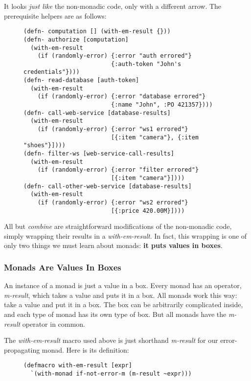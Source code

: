 \documentclass[11pt]{article}
\begin{document}
It looks \emph{just like} the non-monadic code, only with a different
arrow. The prerequisite helpers are as follows:

\begin{figure}[H]
\label{monadic-helpers-1}
\begin{verbatim}
(defn- computation [] (with-em-result {}))
(defn- authorize [computation]
  (with-em-result
    (if (randomly-error) {:error "auth errored"}
                         {:auth-token "John's credentials"})))
(defn- read-database [auth-token]
  (with-em-result
    (if (randomly-error) {:error "database errored"}
                         {:name "John", :PO 421357})))
(defn- call-web-service [database-results]
  (with-em-result
    (if (randomly-error) {:error "ws1 errored"}
                         [{:item "camera"}, {:item "shoes"}])))
(defn- filter-ws [web-service-call-results]
  (with-em-result
    (if (randomly-error) {:error "filter errored"}
                         [{:item "camera"}])))
(defn- call-other-web-service [database-results]
  (with-em-result
    (if (randomly-error) {:error "ws2 errored"}
                         [{:price 420.00M}])))
\end{verbatim}
\end{figure}

All but \emph{combine} are straightforward modifications of the
non-monadic code, simply wrapping their results in a
\emph{with-em-result}. In fact, this wrapping is one of only two things
we must learn about monads: \textbf{it puts values in boxes}.

\subsubsection{Monads Are Values In Boxes}
\label{sec-3-2-1}

An instance of a monad is just a value in a box. Every monad has an
operator, \emph{m-result}, which takes a value and puts it in a
box. All monads work this way: take a value and put it in a box.
The box can be arbitrarily complicated inside, and each type of
monad has its own type of box. But all monads have the \emph{m-result}
operator in common.

The \emph{with-em-result} macro used above is just shorthand \emph{m-result} for
our error-propagating monad. Here is its definition:
\begin{figure}[H]
\label{with-em-result-macro}
\begin{verbatim}
(defmacro with-em-result [expr]
  `(with-monad if-not-error-m (m-result ~expr)))
\end{verbatim}
\end{figure}
\end{document}
